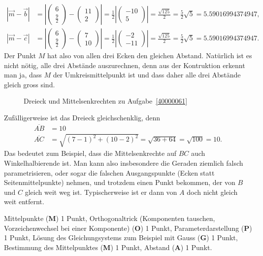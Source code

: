 \begin{loesung}
\begin{teilaufgaben}
\begin{align*}
\\
|\vec{m}-\vec{b}|
&=
\left|\begin{pmatrix}6\\\frac92\end{pmatrix}-\begin{pmatrix}11\\2\end{pmatrix}\right|
=
\frac12\left|\begin{pmatrix}-10\\5\end{pmatrix}\right|
=
\frac{\sqrt{125}}2=\frac52\sqrt{5}
= 5.59016994374947,
\\
|\vec{m}-\vec{c}|
&=
\left|\begin{pmatrix}6\\\frac92\end{pmatrix}-\begin{pmatrix}7\\10\end{pmatrix}\right|
=
\frac12\left|\begin{pmatrix}-2\\-11\end{pmatrix}\right|
=
\frac{\sqrt{125}}2=\frac52\sqrt{5}
= 5.59016994374947.
\end{align*}
Der Punkt $M$ hat also von allen drei Ecken den gleichen Abstand.
Natürlich ist es nicht nötig, alle drei Abstände auszurechnen, denn
aus der Kontruktion erkennt man ja, dass $M$ der Umkreismittelpunkt ist
und dass daher alle drei Abstände gleich gross sind.
\qedhere
\end{teilaufgaben}
\begin{figure}
\centering
{}
\caption{Dreieck und Mittelsenkrechten zu Aufgabe~\ref{40000061}
\label{40000061:dreieck}}
\end{figure}
\end{loesung}

\begin{diskussion}
Zufälligerweise ist das Dreieck gleichschenklig, denn
\begin{align*}
\overline{AB}
&=
10
\\
\overline{AC}
&=
\sqrt{(7-1)^2 + (10-2)^2}=\sqrt{36 + 64}=\sqrt{100}=10.
\end{align*}
Das bedeutet zum Beispiel, dass die Mittelsenkrechte auf $BC$ auch
Winkelhalbierende ist.
Man kann also insbesondere die Geraden ziemlich falsch parametrisieren,
oder sogar die falschen Ausgangspunkte (Ecken statt Seitenmittelpunkte)
nehmen, und trotzdem einen Punkt bekommen, der von $B$ und $C$ gleich
weit weg ist. Typischerweise ist er dann von $A$ doch nicht gleich weit
entfernt.
\end{diskussion}

\begin{bewertung}
Mittelpunkte ({\bf M}) 1 Punkt, Orthogonaltrick (Komponenten tauschen, 
Vorzeichenwechsel bei einer Komponente) ({\bf O}) 1 Punkt,
Parameterdarstellung ({\bf P}) 1 Punkt, Lösung des Gleichungsystems
zum Beispiel mit Gauss ({\bf G}) 1 Punkt, Bestimmung des Mittelpunktes
({\bf M}) 1 Punkt, Abstand ({\bf A}) 1 Punkt.
\end{bewertung}

